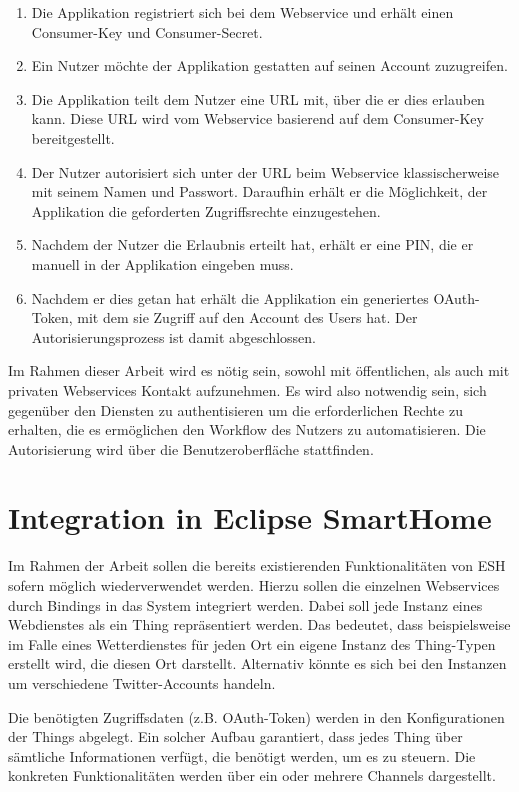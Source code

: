 \begin{enumerate}
\item Die Applikation registriert sich bei dem Webservice und erhält einen Consumer-Key und Consumer-Secret.
\item Ein Nutzer möchte der Applikation gestatten auf seinen Account zuzugreifen.
\item Die Applikation teilt dem Nutzer eine URL mit, über die er dies erlauben kann. Diese URL wird vom Webservice basierend auf dem Consumer-Key bereitgestellt. 
\item Der Nutzer autorisiert sich unter der URL beim Webservice klassischerweise mit seinem Namen und Passwort. Daraufhin erhält er die Möglichkeit, der Applikation die geforderten Zugriffsrechte einzugestehen.
\item Nachdem der Nutzer die Erlaubnis erteilt hat, erhält er eine PIN, die er manuell in der Applikation eingeben muss. 
\item Nachdem er dies getan hat erhält die Applikation ein generiertes OAuth-Token, mit dem sie Zugriff auf den Account des Users hat. Der Autorisierungsprozess ist damit abgeschlossen.
\end{enumerate}


Im Rahmen dieser Arbeit wird es nötig sein, sowohl mit öffentlichen, als auch mit privaten Webservices Kontakt aufzunehmen. Es wird also notwendig sein, sich gegenüber den Diensten zu authentisieren um die erforderlichen Rechte zu erhalten, die es ermöglichen den Workflow des Nutzers zu automatisieren. Die Autorisierung wird über die Benutzeroberfläche stattfinden.



\section{Integration in Eclipse SmartHome}
\label{sec:integrationESH}
Im Rahmen der Arbeit sollen die bereits existierenden Funktionalitäten von ESH sofern möglich wiederverwendet werden. Hierzu sollen die einzelnen Webservices durch Bindings in das System integriert werden. 
Dabei soll jede Instanz eines Webdienstes als ein Thing repräsentiert werden. Das bedeutet, dass beispielsweise im Falle eines Wetterdienstes für jeden Ort ein eigene Instanz des Thing-Typen erstellt wird, die diesen Ort darstellt. Alternativ könnte es sich bei den Instanzen um verschiedene Twitter-Accounts handeln.

Die benötigten Zugriffsdaten (z.B. OAuth-Token) werden in den Konfigurationen der Things abgelegt. Ein solcher Aufbau garantiert, dass jedes Thing über sämtliche Informationen verfügt, die benötigt werden, um es zu steuern. Die konkreten Funktionalitäten werden über ein oder mehrere Channels dargestellt.

